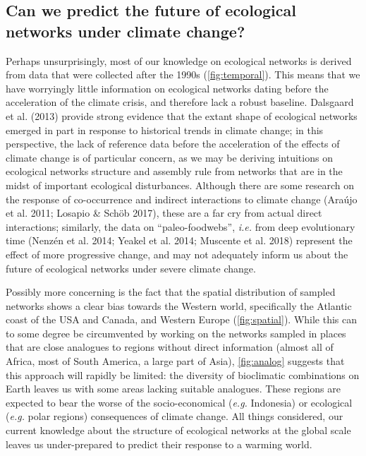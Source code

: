\hypertarget{can-we-predict-the-future-of-ecological-networks-under-climate-change}{%
\subsection{Can we predict the future of ecological networks under
climate
change?}\label{can-we-predict-the-future-of-ecological-networks-under-climate-change}}

Perhaps unsurprisingly, most of our knowledge on ecological networks is
derived from data that were collected after the 1990s
(\cref{fig:temporal}). This means that we have worryingly
little information on ecological networks dating before the acceleration
of the climate crisis, and therefore lack a robust baseline. Dalsgaard
et al. (2013) provide strong evidence that the extant shape of
ecological networks emerged in part in response to historical trends in
climate change; in this perspective, the lack of reference data before
the acceleration of the effects of climate change is of particular
concern, as we may be deriving intuitions on ecological networks
structure and assembly rule from networks that are in the midst of
important ecological disturbances. Although there are some research on
the response of co-occurrence and indirect interactions to climate
change (Araújo et al. 2011; Losapio \& Schöb 2017), these are a far cry
from actual direct interactions; similarly, the data on
``paleo-foodwebs'', \emph{i.e.} from deep evolutionary time (Nenzén et
al. 2014; Yeakel et al. 2014; Muscente et al. 2018) represent the effect
of more progressive change, and may not adequately inform us about the
future of ecological networks under severe climate change.

Possibly more concerning is the fact that the spatial distribution of
sampled networks shows a clear bias towards the Western world,
specifically the Atlantic coast of the USA and Canada, and Western
Europe (\cref{fig:spatial}). While this can to some
degree be circumvented by working on the networks sampled in places that
are close analogues to regions without direct information (almost all of
Africa, most of South America, a large part of Asia), \ref{fig:analog}
suggests that this approach will rapidly be limited: the diversity of
bioclimatic combinations on Earth leaves us with some areas lacking
suitable analogues. These regions are expected to bear the worse of the
socio-economical (\emph{e.g.} Indonesia) or ecological (\emph{e.g.}
polar regions) consequences of climate change. All things considered,
our current knowledge about the structure of ecological networks at the
global scale leaves us under-prepared to predict their response to a
warming world.

